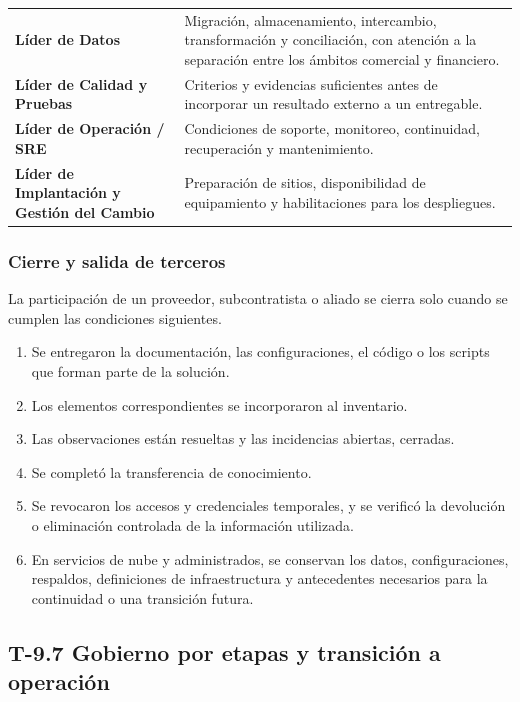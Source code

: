 \documentclass[11pt]{article}
\providecommand{\tightlist}{%
  \setlength{\itemsep}{0pt}\setlength{\parskip}{0pt}}
\begin{document}
\begin{longtable}[]{@{}
  >{\raggedright\arraybackslash}p{}
  >{\raggedright\arraybackslash}p{}@{}}
\textbf{Líder de Datos} & Migración, almacenamiento, intercambio, transformación y conciliación, con atención a la separación entre los ámbitos comercial y financiero. \\ \addlinespace
\textbf{Líder de Calidad y Pruebas} & Criterios y evidencias suficientes antes de incorporar un resultado externo a un entregable. \\ \addlinespace
\textbf{Líder de Operación / SRE} & Condiciones de soporte, monitoreo, continuidad, recuperación y mantenimiento. \\ \addlinespace
\textbf{Líder de Implantación y Gestión del Cambio} & Preparación de sitios, disponibilidad de equipamiento y habilitaciones para los despliegues. \\
\end{longtable}

\subsubsection{Cierre y salida de terceros}\label{t9-6-cierre}

La participación de un proveedor, subcontratista o aliado se cierra solo cuando se cumplen las condiciones siguientes.

\begin{enumerate}
\tightlist
\item
  Se entregaron la documentación, las configuraciones, el código o los scripts que forman parte de la solución.
\item
  Los elementos correspondientes se incorporaron al inventario.
\item
  Las observaciones están resueltas y las incidencias abiertas, cerradas.
\item
  Se completó la transferencia de conocimiento.
\item
  Se revocaron los accesos y credenciales temporales, y se verificó la devolución o eliminación controlada de la información utilizada.
\item
  En servicios de nube y administrados, se conservan los datos, configuraciones, respaldos, definiciones de infraestructura y antecedentes necesarios para la continuidad o una transición futura.
\end{enumerate}

\subsection{T-9.7 Gobierno por etapas y transición a operación}\label{t9-7}
\end{document}
